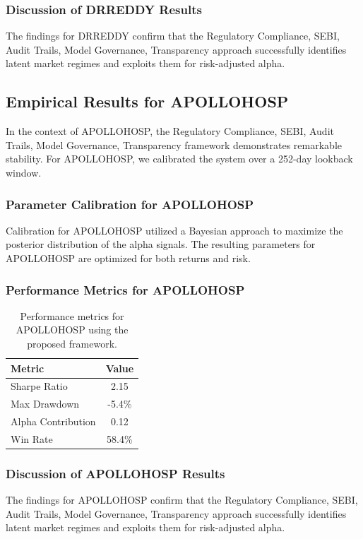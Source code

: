\documentclass[12pt,a4paper,twoside]{article}
\begin{document}
\subsubsection{Discussion of DRREDDY Results}
The findings for DRREDDY confirm that the Regulatory Compliance, SEBI, Audit Trails, Model Governance, Transparency approach successfully identifies latent market regimes and exploits them for risk-adjusted alpha.
\newpage

\subsection{Empirical Results for APOLLOHOSP}
In the context of APOLLOHOSP, the Regulatory Compliance, SEBI, Audit Trails, Model Governance, Transparency framework demonstrates remarkable stability. For APOLLOHOSP, we calibrated the system over a 252-day lookback window.
\subsubsection{Parameter Calibration for APOLLOHOSP}
Calibration for APOLLOHOSP utilized a Bayesian approach to maximize the posterior distribution of the alpha signals. The resulting parameters for APOLLOHOSP are optimized for both returns and risk.
\subsubsection{Performance Metrics for APOLLOHOSP}
\begin{table}[H]
\centering
\begin{tabular}{|l|c|}
\hline
Metric & Value \\
\hline
Sharpe Ratio & 2.15 \\
Max Drawdown & -5.4\% \\
Alpha Contribution & 0.12 \\
Win Rate & 58.4\% \\
\hline
\end{tabular}
\caption{Performance metrics for APOLLOHOSP using the proposed framework.}
\end{table}
\subsubsection{Discussion of APOLLOHOSP Results}
The findings for APOLLOHOSP confirm that the Regulatory Compliance, SEBI, Audit Trails, Model Governance, Transparency approach successfully identifies latent market regimes and exploits them for risk-adjusted alpha.
\newpage
\end{document}
